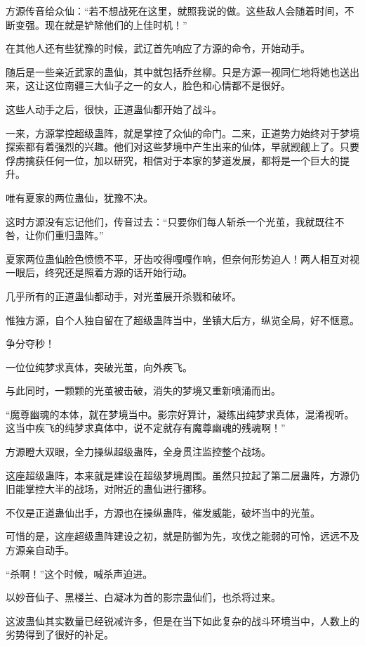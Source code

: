 \begin{this_body}
方源传音给众仙：“若不想战死在这里，就照我说的做。这些敌人会随着时间，不断变强。现在就是铲除他们的上佳时机！”

在其他人还有些犹豫的时候，武辽首先响应了方源的命令，开始动手。

随后是一些亲近武家的蛊仙，其中就包括乔丝柳。只是方源一视同仁地将她也送出来，这让这位南疆三大仙子之一的女人，脸色和心情都不是很好。

这些人动手之后，很快，正道蛊仙都开始了战斗。

一来，方源掌控超级蛊阵，就是掌控了众仙的命门。二来，正道势力始终对于梦境探索都有着强烈的兴趣。他们对这些梦境中产生出来的仙体，早就觊觎上了。只要俘虏擒获任何一位，加以研究，相信对于本家的梦道发展，都将是一个巨大的提升。

唯有夏家的两位蛊仙，犹豫不决。

这时方源没有忘记他们，传音过去：“只要你们每人斩杀一个光茧，我就既往不咎，让你们重归蛊阵。”

夏家两位蛊仙脸色愤愤不平，牙齿咬得嘎嘎作响，但奈何形势迫人！两人相互对视一眼后，终究还是照着方源的话开始行动。

几乎所有的正道蛊仙都动手，对光茧展开杀戮和破坏。

惟独方源，自个人独自留在了超级蛊阵当中，坐镇大后方，纵览全局，好不惬意。

争分夺秒！

一位位纯梦求真体，突破光茧，向外疾飞。

与此同时，一颗颗的光茧被击破，消失的梦境又重新喷涌而出。

“魔尊幽魂的本体，就在梦境当中。影宗好算计，凝练出纯梦求真体，混淆视听。这当中疾飞的纯梦求真体中，说不定就存有魔尊幽魂的残魂啊！”

方源瞪大双眼，全力操纵超级蛊阵，全身贯注监控整个战场。

这座超级蛊阵，本来就是建设在超级梦境周围。虽然只拉起了第二层蛊阵，方源仍旧能掌控大半的战场，对附近的蛊仙进行挪移。

不仅是正道蛊仙出手，方源也在操纵蛊阵，催发威能，破坏当中的光茧。

可惜的是，这座超级蛊阵建设之初，就是防御为先，攻伐之能弱的可怜，远远不及方源亲自动手。

“杀啊！”这个时候，喊杀声迫进。

以妙音仙子、黑楼兰、白凝冰为首的影宗蛊仙们，也杀将过来。

这波蛊仙其实数量已经锐减许多，但是在当下如此复杂的战斗环境当中，人数上的劣势得到了很好的补足。


\end{this_body}
